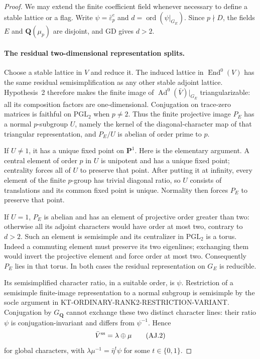 \begin{proof}
We may extend the finite coefficient field whenever
necessary to define a stable lattice or a flag.
Write $\psi=\bar\varepsilon_p^e$ and
$d=\operatorname{ord}(\psi|_{G_E})$.  Since
$p\nmid D$, the fields $E$ and $\mathbf Q(\mu_p)$
are disjoint, and GD gives $d>2$.

\paragraph{The residual two-dimensional representation splits.}
Choose a stable lattice in $V$ and reduce it.
The induced lattice in $\operatorname{End}^0(V)$
has the same residual semisimplification as any
other stable adjoint lattice.  Hypothesis~2
therefore makes the finite image of
$\operatorname{Ad}^0(\bar V)|_{G_E}$ triangularizable:
all its composition factors are one-dimensional.
Conjugation on trace-zero matrices is faithful
on $\mathrm{PGL}_2$ when $p\ne2$.
Thus the finite projective image $P_E$ has a
normal $p$-subgroup $U$, namely the kernel of
the diagonal-character map of that triangular
representation, and $P_E/U$ is abelian of
order prime to $p$.

If $U\ne1$, it has a unique fixed point on
$\mathbf P^1$.  Here is the elementary argument.
A central element of order $p$ in $U$ is
unipotent and has a unique fixed point; centrality
forces all of $U$ to preserve that point.
After putting it at infinity, every element of
the finite $p$-group has trivial diagonal ratio,
so $U$ consists of translations and its common
fixed point is unique.  Normality then forces
$P_E$ to preserve that point.

If $U=1$, $P_E$ is abelian and has an element
of projective order greater than two: otherwise
all its adjoint characters would have order at
most two, contrary to $d>2$.
Such an element is semisimple and its centralizer
in $\mathrm{PGL}_2$ is a torus.  Indeed a commuting
element must preserve its two eigenlines;
exchanging them would invert the projective
element and force order at most two.
Consequently $P_E$ lies in that torus.
In both cases the residual representation on
$G_E$ is reducible.

Its semisimplified character ratio, in a suitable
order, is $\psi$.  Restriction of a semisimple
finite-image representation to a normal subgroup
is semisimple by the socle argument in
KT-ORDINARY-RANK2-RESTRICTION-VARIANT.
Conjugation by $G_{\mathbf Q}$ cannot exchange
these two distinct character lines: their ratio
$\psi$ is conjugation-invariant and differs from
$\psi^{-1}$.  Hence
\[
                  \bar V^{\rm ss}=\lambda\oplus\mu
                                                               \tag{AJ.2}
\]
for global characters, with
$\lambda\mu^{-1}=\bar\eta^t\psi$ for some
$t\in\{0,1\}$.


\end{proof}
